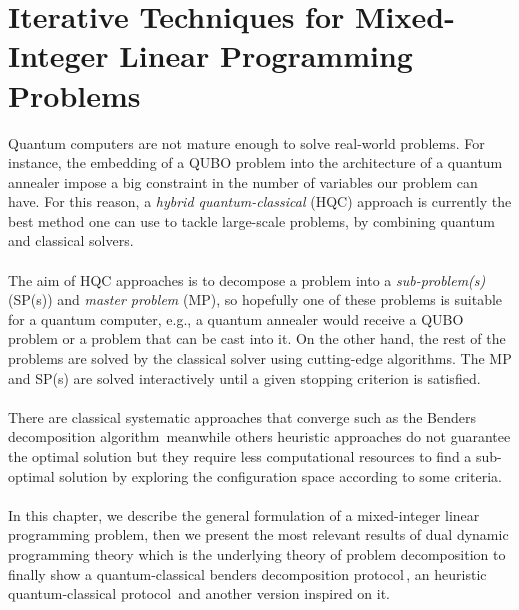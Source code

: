 
\chapter{Iterative Techniques for Mixed-Integer Linear Programming Problems} %

\label{Chapter3} %

Quantum computers are not mature enough to solve real-world problems. For instance, the embedding of a QUBO problem into the architecture of a quantum annealer impose a big constraint in the number of variables our problem can have. For this reason, a \textit{hybrid quantum-classical} (HQC) approach is currently the best method one can use to tackle large-scale problems, by combining quantum and classical solvers.\\\\
The aim of HQC approaches is to decompose a problem into a \textit{sub-problem(s)} (SP(s)) and \textit{master problem} (MP), so hopefully one of these problems is suitable for a quantum computer, e.g., a quantum annealer would receive a QUBO problem or a problem that can be cast into it. On the other hand, the rest of the problems are solved by the classical solver using cutting-edge algorithms. The MP and SP(s) are solved interactively until a given stopping criterion is satisfied. \\\\
There are classical systematic approaches that converge such as the Benders decomposition algorithm\,\cite{Sahinidis1991BDConvergence} meanwhile others heuristic approaches do not guarantee the optimal solution but they require less computational resources to find a sub-optimal solution by exploring the configuration space according to some criteria.\\\\
In this chapter, we describe the general formulation of a mixed-integer linear programming problem, then we present the most relevant results of dual dynamic programming theory which is the underlying theory of problem decomposition to finally show a quantum-classical benders decomposition protocol\,\cite{Zhao2021HybridProgramming}, an heuristic quantum-classical protocol\,\cite{Ding2019ImplementationDesign} and another version inspired on it.
